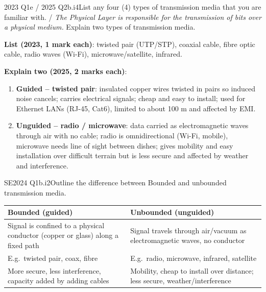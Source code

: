 \documentclass[10pt]{article}
\begin{document}
\begin{pastq}{2023 Q1e \textnormal{/} 2025 Q2b.i}{4}List any four (4) types of transmission media that you are familiar with. /
\emph{The Physical Layer is responsible for the transmission of bits over a physical medium.} Explain two types of transmission media.\end{pastq}
\begin{ans}
\textbf{List (2023, 1 mark each)}: twisted pair (UTP/STP), coaxial cable, fibre optic cable, radio waves (Wi-Fi), microwave/satellite, infrared.

\textbf{Explain two (2025, 2 marks each)}:
\begin{enumerate}
\item \textbf{Guided -- twisted pair}: insulated copper wires twisted in pairs so induced noise cancels; carries electrical signals; cheap and easy to install; used for Ethernet LANs (RJ-45, Cat6), limited to about 100 m and affected by EMI.
\item \textbf{Unguided -- radio / microwave}: data carried as electromagnetic waves through air with no cable; radio is omnidirectional (Wi-Fi, mobile), microwave needs line of sight between dishes; gives mobility and easy installation over difficult terrain but is less secure and affected by weather and interference.
\end{enumerate}
\end{ans}

\begin{pastq}{SE2024 Q1b.i}{2}Outline the difference between Bounded and unbounded transmission media.\end{pastq}
\begin{ans}
\begin{tabularx}{\linewidth}{@{}XX@{}}
\toprule
\textbf{Bounded (guided)} & \textbf{Unbounded (unguided)}\\\midrule
Signal is confined to a physical conductor (copper or glass) along a fixed path & Signal travels through air/vacuum as electromagnetic waves, no conductor\\
E.g.\ twisted pair, coax, fibre & E.g.\ radio, microwave, infrared, satellite\\
More secure, less interference, capacity added by adding cables & Mobility, cheap to install over distance; less secure, weather/interference\\
\bottomrule
\end{tabularx}
\end{ans}
\end{document}
